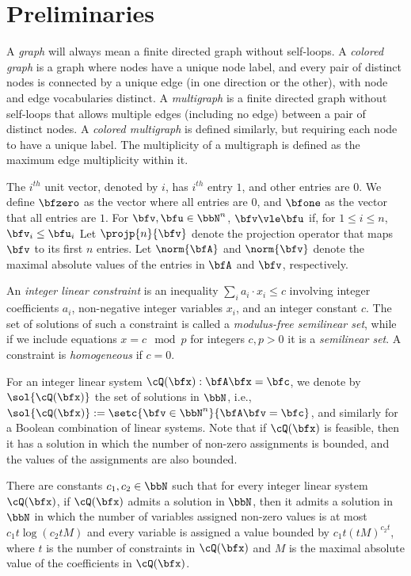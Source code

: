 \section{Preliminaries} \label{sec:prelims}

 A \emph{graph} will always mean a finite directed graph without self-loops.
A \emph{colored graph} is a graph where nodes have a unique node label, and every pair of distinct nodes is connected by a unique edge (in one direction or the other), with node and edge vocabularies distinct.
A \emph{multigraph} is a finite directed graph without self-loops that allows multiple edges (including no edge) between a pair of distinct nodes.
A \emph{colored multigraph} is defined similarly, but requiring each node to have a unique label.
The multiplicity of a multigraph is defined as the maximum edge multiplicity within it.

The $i^{th}$ unit vector, denoted by $\unit{i}$,
has $i^{th}$ entry $1$, and other entries are $0$.
We define $\bfzero$ as the vector where all entries are $0$,
and $\bfone$ as the vector that all entries are $1$.
For  $\bfv, \bfu \in \bbN^n$,
$\bfv \vle \bfu$ if, for $1 \le i \le n$, $\bfv_i \le \bfu_i$
Let $\projp{n}{\bfv}$ denote the projection operator that maps $\bfv$ to its first $n$ entries.
Let $\norm{\bfA}$ and $\norm{\bfv}$ denote the maximal absolute values of the entries in $\bfA$ and $\bfv$, respectively.

An \emph{integer linear constraint} is an inequality $\sum_{i} a_i \cdot x_i \leq c$
involving integer coefficients $a_i$, non-negative integer variables $x_i$, and an integer constant $c$.
The set of solutions of such a constraint is called a \emph{modulus-free semilinear set}, while
if we include equations $x = c \mod p$ for integers $c, p>0$ it is a \emph{semilinear set}.
A constraint is \emph{homogeneous} if $c = 0$.

For an integer linear system $\cQ(\bfx): \bfA \bfx = \bfc$,
we denote by $\sol{\cQ(\bfx)}$ the set of solutions in $\bbN$,
i.e., $\sol{\cQ(\bfx)} := \setc{\bfv \in \bbN^n}{\bfA\bfv = \bfc}$, and similarly for a Boolean combination of linear systems.
Note that if $\cQ(\bfx)$ is feasible,
then it has a solution in which the number of non-zero assignments is bounded, and the values of the assignments are also bounded.

\begin{lemma}\label{lem:ilp}
    There are constants $c_1, c_2 \in \bbN$ such that for every integer linear system $\cQ(\bfx)$,
    if $\cQ(\bfx)$ admits a solution in $\bbN$, then it admits a solution in $\bbN$ in which
    the number of variables assigned non-zero values is at most $c_1t\log\left(c_2tM\right)$ and
    every variable is assigned a value bounded by $c_1t(tM)^{c_2t}$,
    where $t$ is the number of constraints in $\cQ(\bfx)$ and $M$ is the maximal absolute value of the coefficients in $\cQ(\bfx)$.
\end{lemma}


